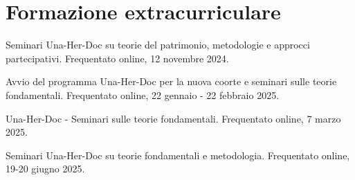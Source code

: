 \section{Formazione extracurriculare}

Seminari Una-Her-Doc su teorie del patrimonio, metodologie e approcci partecipativi. Frequentato online, 12 novembre 2024.

Avvio del programma Una-Her-Doc per la nuova coorte e seminari sulle teorie fondamentali. Frequentato online, 22 gennaio - 22 febbraio 2025.

Una-Her-Doc - Seminari sulle teorie fondamentali. Frequentato online, 7 marzo 2025.

Seminari Una-Her-Doc su teorie fondamentali e metodologia. Frequentato online, 19-20 giugno 2025.